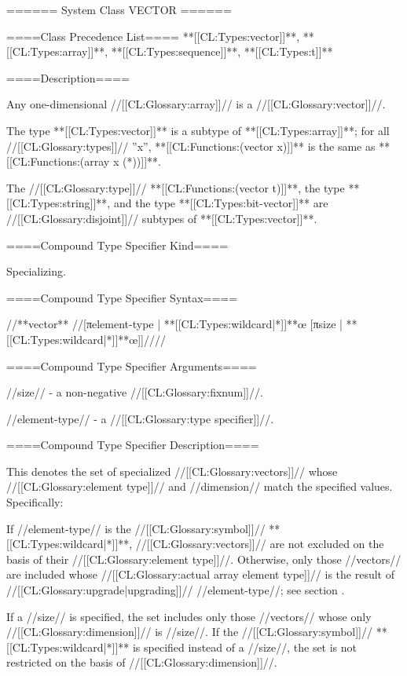 ====== System Class VECTOR ======

====Class Precedence List==== **[[CL:Types:vector]]**, **[[CL:Types:array]]**, **[[CL:Types:sequence]]**, **[[CL:Types:t]]**

====Description====

Any one-dimensional //[[CL:Glossary:array]]// is a //[[CL:Glossary:vector]]//.

The type **[[CL:Types:vector]]** is a subtype of **[[CL:Types:array]]**; for all //[[CL:Glossary:types]]// ''x'', **[[CL:Functions:(vector x)]]** is the same as **[[CL:Functions:(array x (*))]]**.

The //[[CL:Glossary:type]]// **[[CL:Functions:(vector t)]]**, the type **[[CL:Types:string]]**, and the type **[[CL:Types:bit-vector]]** are //[[CL:Glossary:disjoint]]// subtypes of **[[CL:Types:vector]]**.

====Compound Type Specifier Kind====

Specializing.

====Compound Type Specifier Syntax====

//**vector** //[πelement-type | **[[CL:Types:wildcard|*]]**œ [πsize | **[[CL:Types:wildcard|*]]**œ]]////

====Compound Type Specifier Arguments====

//size// - a non-negative //[[CL:Glossary:fixnum]]//.

//element-type// - a //[[CL:Glossary:type specifier]]//.

====Compound Type Specifier Description====

This denotes the set of specialized //[[CL:Glossary:vectors]]// whose //[[CL:Glossary:element type]]// and //dimension// match the specified values. Specifically:

If //element-type// is the //[[CL:Glossary:symbol]]// **[[CL:Types:wildcard|*]]**, //[[CL:Glossary:vectors]]// are not excluded on the basis of their //[[CL:Glossary:element type]]//. Otherwise, only those //vectors// are included whose //[[CL:Glossary:actual array element type]]// is the result of //[[CL:Glossary:upgrade|upgrading]]// //element-type//; see section {\secref\ArrayUpgrading}.

If a //size// is specified, the set includes only those //vectors// whose only //[[CL:Glossary:dimension]]// is //size//. If the //[[CL:Glossary:symbol]]// **[[CL:Types:wildcard|*]]** is specified instead of a //size//, the set is not restricted on the basis of //[[CL:Glossary:dimension]]//.

